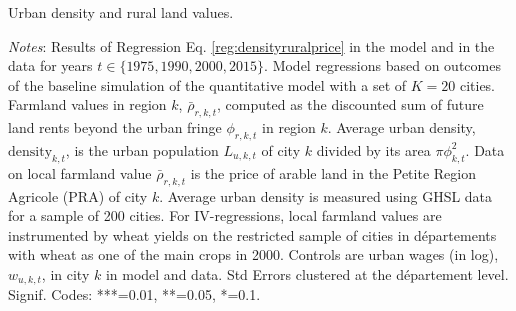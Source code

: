 \documentclass[./20250130-paper.tex]{subfiles}
\begin{document}
\begin{table}[h]
	\vspace{0.5cm}
	\begin{center}
		
		
		
		\caption{Urban density and rural land values.\label{tab:densityruralprice}}
	\end{center}
	{\footnotesize \textit{Notes}: Results of Regression Eq. \ref{reg:densityruralprice} in the model and in the data for years $t \in \{1975, 1990, 2000, 2015\}$. Model regressions based on outcomes of the baseline simulation of the quantitative model with a set of $K=20$ cities. Farmland values in region $k$, $\bar{\rho}_{r,k,t}$, computed as the discounted sum of future land rents beyond the urban fringe $\phi_{r,k,t}$ in region $k$. Average urban density, $\text{density}_{k,t}$, is the urban population $L_{u,k,t}$ of city $k$ divided by its area $\pi \phi^2_{k,t}$. Data on local farmland value $\bar{\rho}_{r,k,t}$ is the price of arable land in the Petite Region Agricole (PRA) of city $k$.  Average urban density is measured using GHSL data for a sample of 200 cities. For IV-regressions, local farmland values are instrumented by wheat yields on the restricted sample of cities in départements with wheat as one of the main crops in 2000. Controls are urban wages (in log), $w_{u,k,t}$, in city $k$ in model and data. Std Errors clustered at the département level. Signif. Codes: ***=0.01, **=0.05, *=0.1.}
\end{table}
\end{document}
